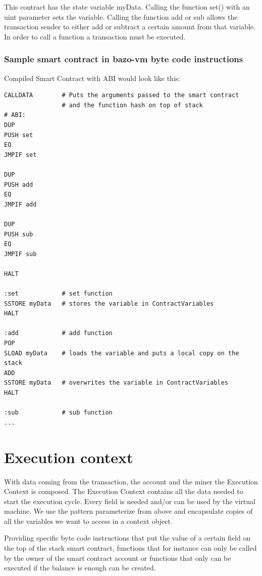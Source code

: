 This contract has the state variable myData. Calling the function set() with an uint parameter sets the variable. Calling the function add or sub allows the transaction sender to either add or subtract a certain amount from that variable. In order to call a function a transaction must be executed.

\subsubsection{Sample smart contract in bazo-vm byte code instructions}
Compiled Smart Contract with ABI would look like this:
\begin{lstlisting}[caption={Bazo-VM byte code instruction contract},captionpos=b,label={lst:dialogex}]
CALLDATA        # Puts the arguments passed to the smart contract
                # and the function hash on top of stack
# ABI:
DUP
PUSH set
EQ
JMPIF set

DUP
PUSH add
EQ
JMPIF add

DUP
PUSH sub
EQ
JMPIF sub

HALT

:set            # set function
SSTORE myData   # stores the variable in ContractVariables
HALT

:add            # add function
POP
SLOAD myData    # loads the variable and puts a local copy on the stack
ADD
SSTORE myData   # overwrites the variable in ContractVariables
HALT

:sub            # sub function
...	
\end{lstlisting}

\section{Execution context}
With data coming from the transaction, the account and the miner the Execution Context is composed. The Execution Context contains all the data needed to start the execution cycle. Every field is needed and/or can be used by the virtual machine. We use the pattern parameterize from above and encapsulate copies of all the variables we want to access in a context object.

Providing specific byte code instructions that put the value of a certain field on the top of the stack smart contract, functions that for instance can only be called by the owner of the smart contract account or functions that only can be executed if the balance is enough can be created.


